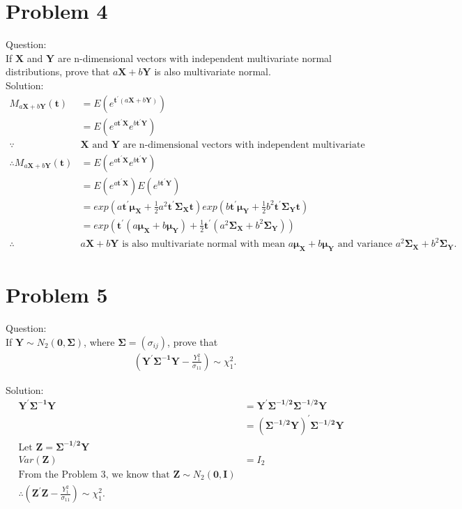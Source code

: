 \documentclass{article}
\begin{document}
\section{Problem 4}
Question:\\
If $\bm{X}$ and $\bm{Y}$ are n-dimensional vectors with independent
multivariate normal distributions, prove that $a\bm{X}+b\bm{Y}$ is
also multivariate normal.\\
Solution:\\
\begin{align*}
  M_{a\bm{X}+b\bm{Y}}(\bm{t})&=E(e^{\bm{t^{\prime}}(a\bm{X}+b\bm{Y})})\\
  &=E(e^{a\bm{t^{\prime}X}}e^{b\bm{t^{\prime}Y}})\\
  \because &\bm{X} \text{ and }\bm{Y} \text{ are n-dimensional vectors with
    independent multivariate normal distributions}\\
  \therefore M_{a\bm{X}+b\bm{Y}}(\bm{t})&=E(e^{a\bm{t^{\prime}X}}e^{b\bm{t^{\prime}Y}})\\
  &=E(e^{a\bm{t^{\prime}X}})E(e^{b\bm{t^{\prime}Y}})\\
  &=exp(a\bm{t^{\prime}\mu_X}+\frac{1}{2}a^2\bm{t^{\prime}\Sigma_Xt}) exp(b\bm{t^{\prime}\mu_Y}+\frac{1}{2}b^2\bm{t^{\prime}\Sigma_Yt})\\
  &=exp(\bm{t^{\prime}}(a\bm{\mu_X}+b\bm{\mu_Y})+\frac{1}{2}\bm{t^{\prime}}(a^2\bm{\Sigma_X}+b^2\bm{\Sigma_Y}))\\
  \therefore &a\bm{X}+b\bm{Y} \text{ is also multivariate normal with
    mean }a\bm{\mu_X}+b\bm{\mu_Y}\text{ and variance }a^2\bm{\Sigma_X}+b^2\bm{\Sigma_Y}
  .
  \end{align*}


\section{Problem 5}
Question:\\
If $\bm{Y} \sim N_2(\bm{0},\bm{\Sigma})$, where
$\bm{\Sigma}=(\sigma_{ij})$, prove that
\begin{align*}
  &(\bm{Y^{\prime}\Sigma^{-1}Y}-\frac{Y_1^2}{\sigma_{11}}) \sim \chi_1^2
  .
  \end{align*}

Solution:\\
\begin{align*}
  \bm{Y^{\prime}\Sigma^{-1}Y}&=\bm{Y^{\prime}\Sigma^{-1/2}\Sigma^{-1/2}Y}\\
  &=\bm{(\Sigma^{-1/2}Y)^{\prime}\Sigma^{-1/2}Y}\\
  \text{Let }\bm{Z}=\bm{\Sigma^{-1/2}Y}\\
  Var(\bm{Z})&=I_2\\
  \text{From the Problem 3, we know that }\bm{Z} \sim N_2(\bm{0,I})\\
  \therefore (\bm{Z^{\prime}Z}-\frac{Y_1^2}{\sigma_{11}}) \sim \chi_1^2
  .
  \end{align*}
\end{document}
